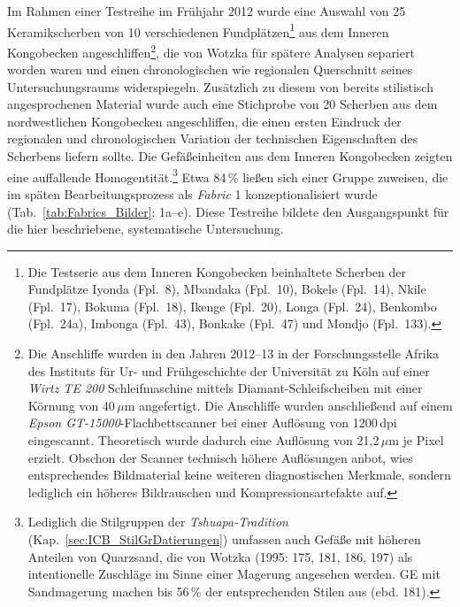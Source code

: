 Im Rahmen einer Testreihe im Frühjahr 2012 wurde eine Auswahl von 25 Keramikscherben von 10 verschiedenen Fundplätzen\footnote{Die Testserie aus dem Inneren Kongobecken beinhaltete Scherben der Fundplätze Iyonda (Fpl.~8), Mbandaka (Fpl.~10), Bokele (Fpl.~14), Nkile (Fpl.~17), Bokuma (Fpl.~18), Ikenge (Fpl.~20), Longa (Fpl.~24), Benkombo (Fpl.~24a), Imbonga (Fpl.~43), Bonkake (Fpl.~47) und Mondjo (Fpl.~133).\label{ftn:Anschliffe2012_ICB_Fpl}} aus dem Inneren Kongobecken angeschliffen\footnote{Die Anschliffe wurden in den Jahren 2012--13 in der Forschungsstelle Afrika des Instituts für Ur- und Frühgeschichte der Universität zu Köln auf einer \textit{Wirtz TE 200} Schleifmaschine mittels Diamant-Schleifscheiben mit einer Körnung von 40\,$\mu$m angefertigt. Die Anschliffe wurden anschließend auf einem \textit{Epson GT-15000}-Flachbettscanner bei einer Auflösung von 1200\,dpi eingescannt. Theoretisch wurde dadurch eine Auflösung von 21,2\,$\mu$m je Pixel erzielt. Obschon der Scanner technisch höhere Auflösungen anbot, wies entsprechendes Bildmaterial keine weiteren diagnostischen Merkmale, sondern lediglich ein höheres Bildrauschen und Kompressionsartefakte auf.}, die von Wotzka für spätere Analysen separiert worden waren und einen chronologischen wie regionalen Querschnitt seines Untersuchungsraums widerspiegeln. Zusätzlich zu diesem von \textcite{Wotzka.1995} bereits stilistisch angesprochenen Material wurde auch eine Stichprobe von 20 Scherben aus dem nordwestlichen Kongobecken angeschliffen, die einen ersten Eindruck der regionalen und chronologischen Variation der technischen Eigenschaften des Scherbens liefern sollte. Die Gefäßeinheiten aus dem Inneren Kongobecken zeigten eine auffallende Homogentität.\footnote{Lediglich die Stilgruppen der \textit{Tshuapa-Tradition} (Kap.~\ref{sec:ICB_StilGrDatierungen}) umfassen auch Gefäße mit höheren Anteilen von Quarzsand, die von Wotzka (1995: 175, 181, 186, 197) als intentionelle Zuschläge im Sinne einer Magerung angesehen werden. GE mit Sandmagerung machen bis 56\,\% der entsprechenden Stilen aus (ebd. 181).\label{ftn:Sandmagerung}} Etwa 84\,\% ließen sich einer Gruppe zuweisen, die im späten Bearbeitungsprozess als \textit{Fabric} 1 konzeptionalisiert wurde (Tab.~\ref{tab:Fabrics_Bilder}: 1a--e). Diese Testreihe bildete den Ausgangspunkt für die hier beschriebene, systematische Untersuchung.


